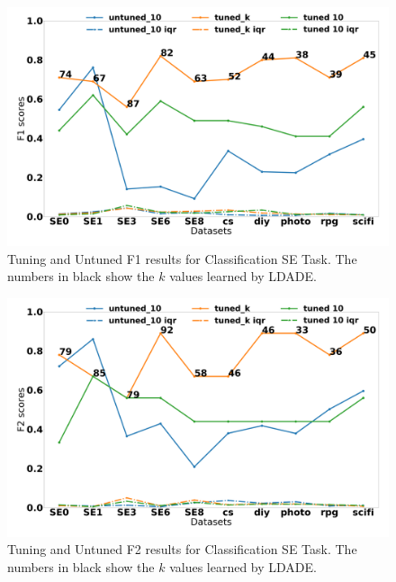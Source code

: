 \documentclass[twocolumn,5p,sort&compress]{elsarticle}
\theoremstyle{break}
\begin{document}
\begin{figure}[!htbp]
  \begin{center}
    \includegraphics[width=\linewidth]{./fig/F1_temp.png}
    \end{center}
  \caption{Tuning and Untuned F1 results for Classification SE Task. The numbers in black show the $k$ values
  learned by LDADE.}\label{fig:classF1}  
\end{figure}

\begin{figure}[!htbp]
  \begin{center}
    \includegraphics[width=\linewidth]{./fig/F2_temp.png}
    \end{center}
  \caption{Tuning and Untuned F2 results for Classification SE Task. The numbers in black show the $k$ values
  learned by LDADE.}\label{fig:classF2}  
\end{figure}
\end{document}
